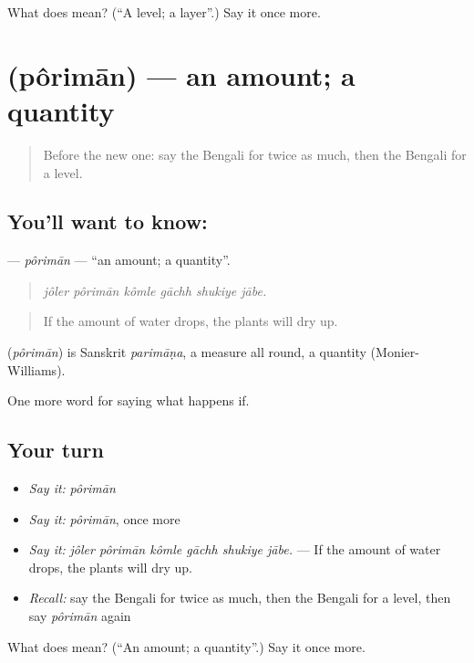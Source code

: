 \begin{tcolorbox}[breakable,colback=teal!4,colframe=teal!35!black,title={Before you move on}]
What does  mean? (\textquotedblleft{}A level; a layer\textquotedblright{}.) Say it once more.
\end{tcolorbox}
\section[\texorpdfstring{\bn{পরিমাণ} (pôrimān)}{পরিমাণ (pôrimān)}]{ (pôrimān) — an amount; a quantity}

\label{lesson:BN-C372-poriman}



\begin{quote}
Before the new one: say the Bengali for twice as much, then the Bengali for a level.
\end{quote}

\subsection*{You'll want to know: }
\textbf{} — \emph{pôrimān} — \textquotedblleft{}an amount; a quantity\textquotedblright{}.

\begin{quote}
     
\end{quote}

\begin{quote}
\emph{jôler pôrimān kômle gāchh shukiye jābe.}
\end{quote}

\begin{quote}
If the amount of water drops, the plants will dry up.
\end{quote}

\begin{cousinweb}
\textbf{} (\emph{pôrimān}) is Sanskrit \emph{parimāṇa}, a measure all round, a quantity (Monier-Williams).
\end{cousinweb}

\begin{grammarlens}[title={What you've built}]
One more word for saying what happens if.
\end{grammarlens}

\subsection*{Your turn}
\begin{itemize}
\raggedright
  \item \emph{Say it:} \emph{pôrimān}
  \item \emph{Say it:} \emph{pôrimān}, once more
  \item \emph{Say it:} \emph{jôler pôrimān kômle gāchh shukiye jābe.} — If the amount of water drops, the plants will dry up.
  \item \emph{Recall:} say the Bengali for twice as much, then the Bengali for a level, then say \emph{pôrimān} again
\end{itemize}

\begin{tcolorbox}[breakable,colback=teal!4,colframe=teal!35!black,title={Before you move on}]
What does  mean? (\textquotedblleft{}An amount; a quantity\textquotedblright{}.) Say it once more.
\end{tcolorbox}
